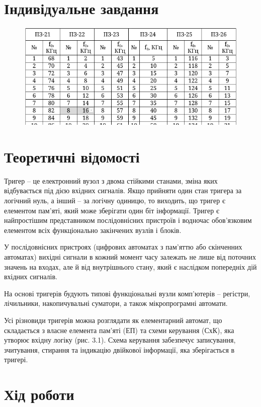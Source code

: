 \documentclass{article}
\begin{document}
\begin{normalsize}
	\section*{Індивідуальне завдання}
\begin{figure}[H]
		\centering
		\includegraphics[scale=0.75]{v}
	\end{figure}	

	\section*{Теоретичні відомості}
	Тригер – це електронний вузол з двома стійкими станами, зміна яких відбувається під дією вхідних сигналів. Якщо прийняти один стан тригера за логічний нуль, а інший – за логічну одиницю, то виходить, що тригер є елементом пам’яті, який може зберігати один біт інформації. Тригер є найпростішим представником послідовнісних пристроїв і водночас обов’язковим елементом всіх функціонально закінчених вузлів і блоків.
	
	У послідовнісних пристроях (цифрових автоматах з пам’яттю або скінченних автоматах) вихідні сигнали в кожний момент часу залежать не лише від поточних значень на входах, але й від внутрішнього стану, який є наслідком попередніх дій вхідних сигналів. 
	
	На основі тригерів будують типові функціональні вузли комп’ютерів – регістри, лічильники, накопичувальні суматори, а також мікропрограмні автомати.
	
	Усі різновиди тригерів можна розглядати як елементарний автомат, що складається з власне елемента пам’яті (ЕП) та схеми керування (СхК), яка утворює вхідну логіку (рис. 3.1). Схема керування забезпечує записування, зчитування, стирання та індикацію двійкової інформації, яка зберігається в тригері. 
	
	
	\section*{Хід роботи}
	


\end{normalsize}
\end{document}
